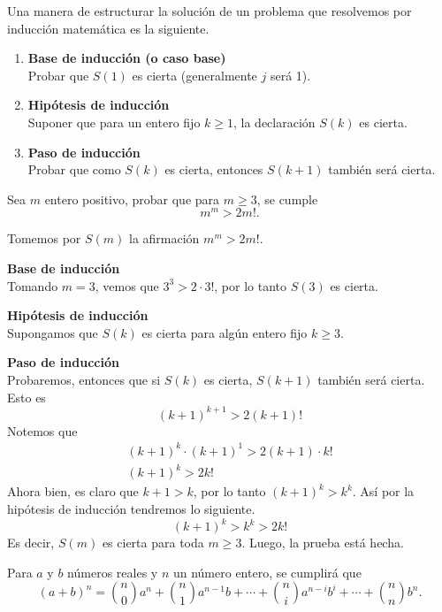 Una manera de estructurar la solución de un problema que resolvemos por inducción matemática es la siguiente.
\begin{enumerate}
    \item \textbf{Base de inducción (o caso base)}\\
    Probar que $S(1)$ es cierta (generalmente $j$ será 1).

    \item \textbf{Hipótesis de inducción}\\
    Suponer que para un entero fijo $k \geq 1$, la declaración $S(k)$ es cierta.

    \item \textbf{Paso de inducción}\\
    Probar que como $S(k)$ es cierta, entonces $S(k + 1)$ también será cierta.
\end{enumerate}

\begin{section-example.tcb}
    Sea $m$ entero positivo, probar que para $m \geq 3$, se cumple \[m^m > 2m!.\]
\end{section-example.tcb}

\begin{solution}
    Tomemos por $S(m)$ la afirmación $m^m > 2m!$.

    \textbf{Base de inducción}\\
    Tomando $m = 3$, vemos que $3^3 > 2\cdot3!$, por lo tanto $S(3)$ es cierta.

    \textbf{Hipótesis de inducción}\\
    Supongamos que $S(k)$ es cierta para algún entero fijo $k\geq 3$.

    \textbf{Paso de inducción}\\
    Probaremos, entonces que si $S(k)$ es cierta, $S(k + 1)$ también será cierta.
    Esto es
    \[(k + 1)^{k + 1} > 2(k + 1)!\]
    Notemos que
    \begin{gather*}
    (k + 1)^{k}\cdot(k + 1)^1 > 2(k + 1)\cdot k!\\
    (k + 1)^k > 2k!
    \end{gather*}
    Ahora bien, es claro que $k + 1 > k$, por lo tanto $(k + 1)^k > k^k$.
    Así por la hipótesis de inducción tendremos lo siguiente.
    \[(k + 1)^k > k^k > 2k!\]
    Es decir, $S(m)$ es cierta para toda $m\geq 3$.
    Luego, la prueba está hecha.
\end{solution}

\begin{section-theorem.tcb}
    Para $a$ y $b$ números reales y $n$ un número entero, se cumplirá que
    \[(a + b)^n = \binom{n}{0}a^n + \binom{n}{1}a^{n - 1}b + \cdots + \binom{n}{i}a^{n - i}b^i + \cdots + \binom{n}{n}b^n.\]
\end{section-theorem.tcb}

